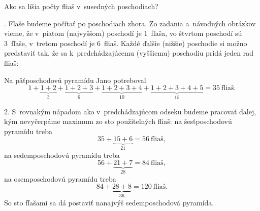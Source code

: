 {%
\napad
Ako sa líšia počty fliaš v~susedných poschodiach?

.
Fľaše budeme počítať po poschodiach zhora.
Zo zadania a~návodných obrázkov vieme, že v~piatom (najvyššom) poschodí je 1~fľaša,
vo štvrtom poschodí sú 3~fľaše, v~treťom poschodí je 6~fliaš.
Každé ďalšie (nižšie) poschodie si možno predstaviť tak, že sa k~predchádzajúcemu (vyššiemu) poschodiu pridá jeden rad fliaš:
%


Na päťposchodovú pyramídu Jano potreboval
$$
1+\underbrace{1+2}_3+\underbrace{1+2+3}_6+\underbrace{1+2+3+4}_{10}+\underbrace{1+2+3+4+5}_{15} =35\ \text{fliaš}.
$$

2.
S~rovnakým nápadom ako v~predchádzajúcom odseku budeme pracovať ďalej, kým nevyčerpáme maximum zo sto použiteľných fliaš:
na šesťposchodovú pyramídu treba
$$
35+\underbrace{15+6}_{21}=56\ \text{fliaš},
$$
na sedemposchodovú pyramídu treba
$$
56+\underbrace{21+7}_{28}=84\ \text{fliaš},
$$
na osemposchodovú pyramídu treba
$$
84+\underbrace{28+8}_{36}=120\ \text{fliaš}.
$$
So sto fľašami sa dá postaviť nanajvýš sedemposchodová pyramída.
}

